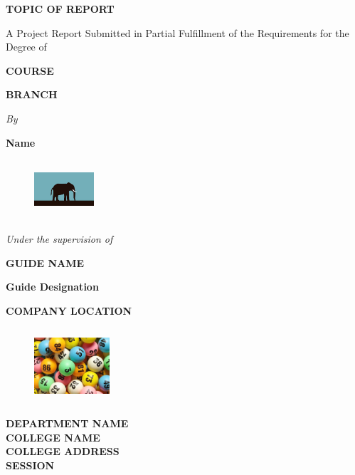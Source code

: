 \documentclass[12pt,a4paper]{report}
\begin{document}
\begin{center}
\thispagestyle{empty}
\parskip=8pt%
\vspace*{1\parskip}%

\textbf{TOPIC OF REPORT}

A Project Report Submitted in Partial Fulfillment of the Requirements for the Degree of
\parskip=20pt

\textbf{COURSE}
\parskip=4pt

\textbf{BRANCH}

\textit{By}

\parskip=8pt%
\textbf{Name}

\begin{figure}[ht]
\includegraphics[width=2.2098cm, height=2.2098cm]{image2}
\centering
\label{1}
\end{figure}

\textit{Under the supervision of}
\parskip=24pt%


\textbf{GUIDE NAME}
\parskip=4pt

\textbf{Guide Designation}

\textbf{COMPANY LOCATION}
\begin{figure}[ht]
\includegraphics[width=2.8cm, height=2.8cm]{image1}
\centering
\label{2}
\end{figure}

\textbf{DEPARTMENT NAME}\\
\textbf{COLLEGE NAME}\\
\textbf{COLLEGE ADDRESS}\\
\textbf{SESSION}
\end{center}
\end{document}
